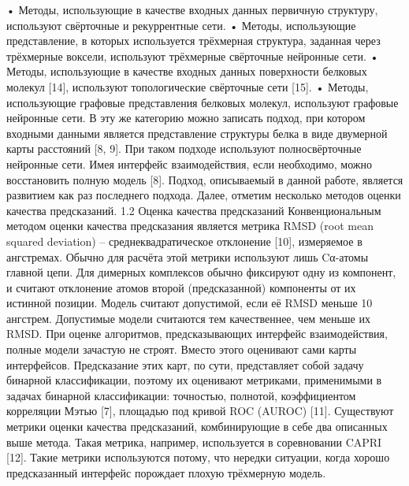 •	Методы, использующие в качестве входных данных первичную структуру, используют свёрточные и рекуррентные сети.
•	Методы, использующие представление, в которых используется трёхмерная структура, заданная через трёхмерные воксели, используют трёхмерные свёрточные нейронные сети.
•	Методы, использующие в качестве входных данных поверхности белковых молекул [14], используют топологические свёрточные сети [15].
•	Методы, использующие графовые представления белковых молекул, используют графовые нейронные сети.
В эту же категорию можно записать подход, при котором входными данными является представление структуры белка в виде двумерной карты расстояний [8, 9]. При таком подходе используют полносвёрточные нейронные сети. Имея интерфейс взаимодействия, если необходимо, можно восстановить полную модель [8].
	Подход, описываемый в данной работе, является развитием как раз последнего подхода. Далее, отметим несколько методов оценки качества предсказаний.
1.2 Оценка качества предсказаний
	Конвенциональным методом оценки качества предсказания является метрика RMSD (root mean squared deviation) – среднеквадратическое отклонение [10], измеряемое в ангстремах. Обычно для расчёта этой метрики  используют лишь Cα-атомы главной цепи. Для димерных комплексов обычно фиксируют одну из компонент, и считают отклонение атомов второй (предсказанной) компоненты от их истинной позиции. Модель считают допустимой, если её RMSD меньше 10 ангстрем. Допустимые модели считаются тем качественнее, чем меньше их RMSD.
	При оценке алгоритмов, предсказывающих интерфейс взаимодействия, полные модели зачастую не строят. Вместо этого оценивают сами карты интерфейсов. Предсказание этих карт, по сути, представляет собой задачу бинарной классификации, поэтому их оценивают метриками, применимыми в задачах бинарной классификации: точностью, полнотой, коэффициентом корреляции Мэтью [7], площадью под кривой ROC (AUROC) [11].
	Существуют метрики оценки качества предсказаний, комбинирующие в себе два описанных выше метода. Такая метрика, например, используется в соревновании CAPRI [12]. Такие метрики используются потому, что нередки ситуации, когда хорошо предсказанный интерфейс порождает плохую трёхмерную модель.









